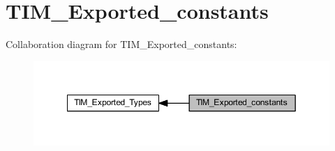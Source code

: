 \hypertarget{group___t_i_m___exported__constants}{}\section{T\+I\+M\+\_\+\+Exported\+\_\+constants}
\label{group___t_i_m___exported__constants}
Collaboration diagram for T\+I\+M\+\_\+\+Exported\+\_\+constants\+:
\nopagebreak
\begin{figure}[H]
\begin{center}
\leavevmode
\includegraphics[width=349pt]{group___t_i_m___exported__constants}
\end{center}
\end{figure}
